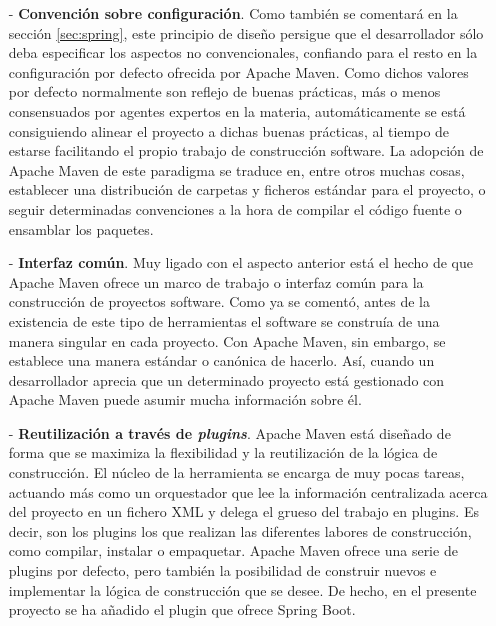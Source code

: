 \documentclass[a4paper,12pt,twoside,openright]{report}
\begin{document}
    \begin{itemize}
    	\item[-] \textbf{Convención sobre configuración}. Como también se comentará en la sección \ref{sec:spring}, este principio de diseño persigue que el desarrollador sólo deba especificar los aspectos no convencionales, confiando para el resto en la configuración por defecto ofrecida por Apache Maven. Como dichos valores por defecto normalmente son reflejo de buenas prácticas, más o menos consensuados por agentes expertos en la materia, automáticamente se está consiguiendo alinear el proyecto a dichas buenas prácticas, al tiempo de estarse facilitando el propio trabajo de construcción software. La adopción de Apache Maven de este paradigma se traduce en, entre otros muchas cosas, establecer una distribución de carpetas y ficheros estándar para el proyecto, o seguir determinadas convenciones a la hora de compilar el código fuente o ensamblar los paquetes.
    	
    	\item[-] \textbf{Interfaz común}. Muy ligado con el aspecto anterior está el hecho de que Apache Maven ofrece un marco de trabajo o interfaz común para la construcción de proyectos software. Como ya se comentó, antes de la existencia de este tipo de herramientas el software se construía de una manera singular en cada proyecto. Con Apache Maven, sin embargo, se establece una manera estándar o canónica de hacerlo. Así, cuando un desarrollador aprecia que un determinado proyecto está gestionado con Apache Maven puede asumir mucha información sobre él.
    	
    	\item[-] \textbf{Reutilización a través de \emph{plugins}}. Apache Maven está diseñado de forma que se maximiza la flexibilidad y la reutilización de la lógica de construcción. El núcleo de la herramienta se encarga de muy pocas tareas, actuando más como un orquestador que lee la información centralizada acerca del proyecto en un fichero XML y delega el grueso del trabajo en plugins. Es decir, son los plugins los que realizan las diferentes labores de construcción, como compilar, instalar o empaquetar. Apache Maven ofrece una serie de plugins por defecto, pero también la posibilidad de construir nuevos e implementar la lógica de construcción que se desee. De hecho, en el presente proyecto se ha añadido el plugin que ofrece Spring Boot.
    	

\end{itemize}
\end{document}
